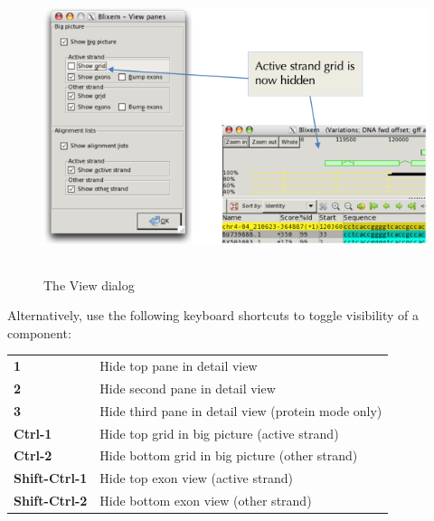 \documentclass[letterpaper]{article}
\begin{document}
\begin{figure}
\centering
\color[rgb]{0.30980393,0.5058824,0.7411765}
\includegraphics[width=13.818cm,height=8.546cm]{img_dialog_view.png}
\caption{The View dialog}
\end{figure}

\bigskip

{Alternatively, use the following keyboard shortcuts to toggle visibility
of a component:}

\begin{center}
\tablehead{}
\begin{supertabular}{p{2.289cm}p{11.909cm}}
\bfseries 1 &
 Hide top pane in detail view\\
\bfseries 2 &
 Hide second pane in detail view\\

{\textbf{3}}{ } &
 Hide third pane in detail view (protein mode
only)\\

{\textbf{Ctrl-1}}{ }
&
 Hide top grid in big picture (active strand)\\

{\textbf{Ctrl-2}}{ }
&
 Hide bottom grid in big picture (other
strand)\\

{\textbf{Shift-Ctrl-1}}{
} &
 Hide top exon view (active strand)\\

{\textbf{Shift-Ctrl-2}}{
} &
 Hide bottom exon view (other strand)\\
\end{supertabular}
\end{center}
\end{document}
